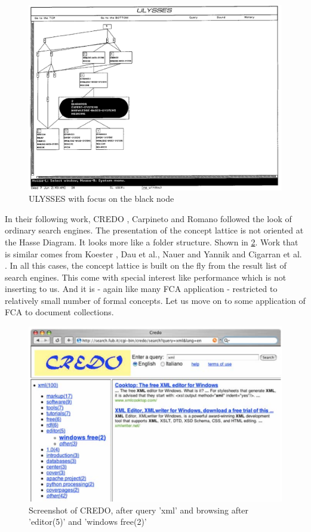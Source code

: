 \documentclass[11pt]{report}
\begin{document}
\begin{figure}[!ht]
	\centering
	\includegraphics[width=\linewidth]{images/ulysses}
\caption{ULYSSES with focus on the black node \cite{Carpineto1996} }
\label{figure:ulysses}
\end{figure}

In their following work, CREDO \cite{Carpineto2004}, Carpineto and Romano followed the look of ordinary search engines. The presentation of the concept lattice is not oriented at the Hasse Diagram. It looks more like a folder structure. Shown in \ref{figure:credo}. Work that is similar comes from Koester \cite{Koester2006}, Dau et al.\cite{Dau2008}, Nauer and Yannik \cite{Nauer2009} and Cigarran et al. \cite{Cigarran2004}. In all this cases, the concept lattice is built on the fly from the result list of search engines. This come with special interest like performance which is not inserting to us. And it is - again like many FCA application - restricted to relatively small number of formal concepts. Let us move on to some application of FCA to document collections. \\

\begin{figure}[!ht]
	\centering
	\includegraphics[width=\linewidth]{images/credo}
\caption{Screenshot of CREDO, after query 'xml' and browsing after 'editor(5)' and 'windows free(2)' \cite{Carpineto2004} }
\label{figure:credo}
\end{figure}
\end{document}
